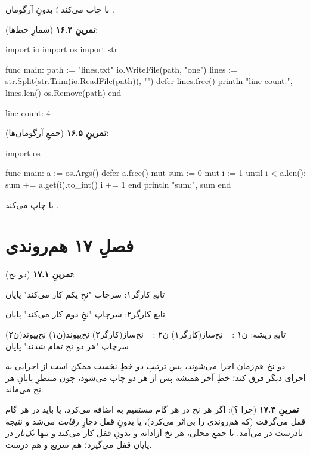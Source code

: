 با  چاپ می‌کند ؛ بدونِ آرگومان .

\textbf{تمرینِ ۱۶.۳} (شمارِ خط‌ها):
\begin{salamen}
import io
import os
import str

func main:
    path := "lines.txt"
    io.WriteFile(path, "one\ntwo\nthree\nfour\n")
    lines := str.Split(str.Trim(io.ReadFile(path)), "\n")
    defer lines.free()
    println "line count:", lines.len()
    os.Remove(path)
end
\end{salamen}

\begin{progout}
line count: 4
\end{progout}

\textbf{تمرینِ ۱۶.۵} (جمعِ آرگومان‌ها):
\begin{salamen}
import os

func main:
    a := os.Args()
    defer a.free()
    mut sum := 0
    mut i := 1
    until i < a.len():
        sum += a.get(i).to_int()
        i += 1
    end
    println "sum:", sum
end
\end{salamen}

با  چاپ می‌کند .

\section*{فصلِ ۱۷ هم‌روندی}
{}

\textbf{تمرینِ ۱۷.۱} (دو نخ):
\begin{salamfa}
تابع کارگر۱:
    سرچاپ "نخِ یکم کار می‌کند"
پایان

تابع کارگر۲:
    سرچاپ "نخِ دوم کار می‌کند"
پایان

تابع ریشه:
    ن۱ := نخ‌ساز(کارگر۱)
    ن۲ := نخ‌ساز(کارگر۲)
    نخ‌پیوند(ن۱)
    نخ‌پیوند(ن۲)
    سرچاپ "هر دو نخ تمام شدند"
پایان
\end{salamfa}

دو نخ هم‌زمان اجرا می‌شوند، پس ترتیبِ دو خطِ نخست ممکن است از اجرایی به اجرای دیگر فرق کند؛ خطِ آخر همیشه پس از هر دو چاپ می‌شود، چون  منتظرِ پایانِ هر نخ می‌ماند.

\textbf{تمرینِ ۱۷.۳} (چرا ؟): اگر هر نخ در هر گام مستقیم به  اضافه می‌کرد، یا باید در هر گام قفل می‌گرفت (که هم‌روندی را بی‌اثر می‌کرد)، یا بدونِ قفل دچارِ \emph{رقابت} می‌شد و نتیجه نادرست در می‌آمد. با جمعِ محلی، هر نخ آزادانه و بدونِ قفل کار می‌کند و تنها \emph{یک‌بار} در پایان قفل می‌گیرد؛ هم سریع و هم درست.

